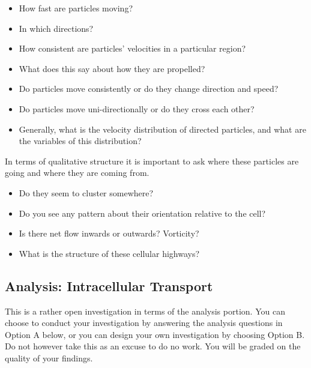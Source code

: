 \documentclass{../lab}
\begin{document}
\begin{itemize}
    \item How fast are particles moving?

    \item In which directions?

    \item How consistent are particles' velocities in a particular region?

    \item What does this say about how they are propelled?

    \item Do particles move consistently or do they change direction and speed?

    \item Do particles move uni-directionally or do they cross each other?

    \item Generally, what is the velocity distribution of directed particles, and what are the variables of this distribution?
\end{itemize}

In terms of qualitative structure it is important to ask where these particles are going and where they are coming from.

\begin{itemize}
    \item Do they seem to cluster somewhere?

    \item Do you see any pattern about their orientation relative to the cell?

    \item Is there net flow inwards or outwards? Vorticity?

    \item What is the structure of these cellular highways?
\end{itemize}



\subsection{Analysis: Intracellular Transport}

This is a rather open investigation in terms of the analysis portion. You can choose to conduct your investigation by answering the analysis questions in Option A below, or you can design your own investigation by choosing Option B. Do not however take this as an excuse to do no work. You will be graded on the quality of your findings.
\end{document}
